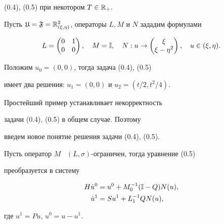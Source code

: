 (0.4), (0.5) при некотором $T \in {\Bbb R}_{+}.$





\begin{examnonum}


Пусть ${\frak U} = {\frak F} = {\Bbb R}^2_{(\xi


,\eta )}$, операторы $L, M$ и $N$ зададим формулами


$$


L =\begin{pmatrix} 0 & 1 \\ 0 & 0


\end{pmatrix},\quad


M = {\Bbb I},\quad


N: u \to \begin{pmatrix}


\xi \\ \xi - \eta^2


\end{pmatrix},\quad


u \in ( \xi ,\eta).


$$


Положим $u_0 = (0, 0)$, тогда задача (0.4), (0.5) 


имеет два решения: $u_1 = (0, 0)$ и $u_2 = (t/2,t^2/4)$.


\end{examnonum}





Простейший пример устанавливает некорректность 


задачи (0.4), (0.5) в общем случае. Поэтому


введем новое понятие решения задачи (0.4), (0.5). 


Пусть оператор $M$ \ $(L,\sigma)$-ограничен, тогда уравнение (0.5)


преобразуется в систему


\begin{align}


H\Dot u^0 &= u^0 + M_0^{-1}({\Bbb I}-Q)N(u),\\


%


\Dot u^1 &= Su^1 + L_1^{-1}QN(u),


\end{align}


где $u^1 = Pu$, $u^0 = u - u^1$.





